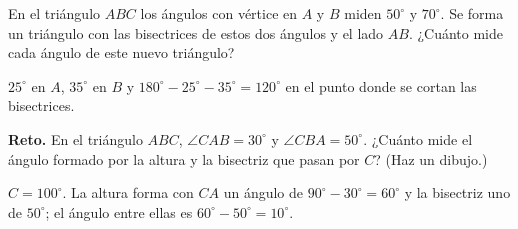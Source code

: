 \documentclass[11pt]{article}
\begin{document}
\begin{preguntas}
\pregunta En el triángulo $ABC$ los ángulos con vértice en $A$ y $B$ miden $50^\circ$ y
$70^\circ$. Se forma un triángulo con las bisectrices de estos dos ángulos y el lado $AB$.
¿Cuánto mide cada ángulo de este nuevo triángulo?
\begin{solucion}[3cm]
$25^\circ$ en $A$, $35^\circ$ en $B$ y $180^\circ - 25^\circ - 35^\circ = 120^\circ$ en el
punto donde se cortan las bisectrices.
\end{solucion}

\pregunta \textbf{Reto.} En el triángulo $ABC$, $\angle CAB = 30^\circ$ y
$\angle CBA = 50^\circ$. ¿Cuánto mide el ángulo formado por la altura y la bisectriz que
pasan por $C$? (Haz un dibujo.)
\begin{solucion}[4cm]
$C = 100^\circ$. La altura forma con $CA$ un ángulo de $90^\circ - 30^\circ = 60^\circ$ y la
bisectriz uno de $50^\circ$; el ángulo entre ellas es $60^\circ - 50^\circ = 10^\circ$.
\end{solucion}

\end{preguntas}
\end{document}
